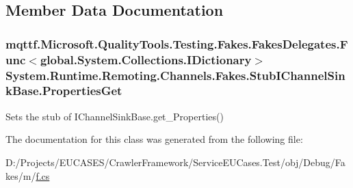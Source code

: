 \subsection{Member Data Documentation}
\hypertarget{class_system_1_1_runtime_1_1_remoting_1_1_channels_1_1_fakes_1_1_stub_i_channel_sink_base_af41481955986aa1df6b6e90e635f0d3b}{
\subsubsection[{Properties\-Get}]{\setlength{\rightskip}{0pt plus 5cm}mqttf.\-Microsoft.\-Quality\-Tools.\-Testing.\-Fakes.\-Fakes\-Delegates.\-Func$<$global.\-System.\-Collections.\-I\-Dictionary$>$ System.\-Runtime.\-Remoting.\-Channels.\-Fakes.\-Stub\-I\-Channel\-Sink\-Base.\-Properties\-Get}}\label{class_system_1_1_runtime_1_1_remoting_1_1_channels_1_1_fakes_1_1_stub_i_channel_sink_base_af41481955986aa1df6b6e90e635f0d3b}


Sets the stub of I\-Channel\-Sink\-Base.\-get\-\_\-\-Properties()



The documentation for this class was generated from the following file\-:\begin{DoxyCompactItemize}
\item 
D\-:/\-Projects/\-E\-U\-C\-A\-S\-E\-S/\-Crawler\-Framework/\-Service\-E\-U\-Cases.\-Test/obj/\-Debug/\-Fakes/m/\hyperlink{m_2f_8cs}{f.\-cs}\end{DoxyCompactItemize}
